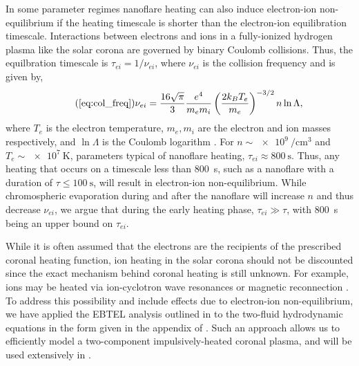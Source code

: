 In some parameter regimes nanoflare heating can also induce electron-ion non-equilibrium if the heating timescale is shorter than the electron-ion equilibration timescale. Interactions between electrons and ions in a fully-ionized hydrogen plasma like the solar corona are governed by binary Coulomb collisions. Thus, the equilbration timescale is $\tau_{ei}=1/\nu_{ei}$, where $\nu_{ei}$ is the collision frequency and is given by,
\begin{equation}\tag{\ref{eq:col_freq}}
    \nu_{ei} = \frac{16\sqrt{\pi}}{3}\frac{e^4}{m_em_i}\left(\frac{2k_BT_e}{m_e}\right)^{-3/2}n\ln{\Lambda},
\end{equation}
where $T_e$ is the electron temperature, $m_e,m_i$ are the electron and ion masses respectively, and $\ln{\Lambda}$ is the Coulomb logarithm \citep[see both Eq. 2.5e and Section 3 of][]{braginskii_transport_1965}. For $n\sim\SI{e9}{\per\cubic\cm}$ and $T_e\sim\SI{e7}{\kelvin}$, parameters typical of nanoflare heating, $\tau_{ei}\approx\SI{800}{\second}$. Thus, any heating that occurs on a timescale less than \SI{800}{\second}, such as a nanoflare with a duration of $\tau\le\SI{100}{\second}$, will result in electron-ion non-equilibrium. While chromospheric evaporation during and after the nanoflare will increase $n$ and thus decrease $\nu_{ei}$, we argue that during the early heating phase, $\tau_{ei}\gg\tau$, with \SI{800}{\second} being an upper bound on $\tau_{ei}$.

While it is often assumed that the electrons are the recipients of the prescribed coronal heating function, ion heating in the solar corona should not be discounted since the exact mechanism behind coronal heating is still unknown. For example, ions may be heated via ion-cyclotron wave resonances \citep[e.g.][]{markovskii_intermittent_2004} or magnetic reconnection \citep[e.g.][]{ono_ion_1996,drake_onset_2014}. To address this possibility and include effects due to electron-ion non-equilibrium, we have applied the EBTEL analysis outlined in \citet{klimchuk_highly_2008} to the two-fluid hydrodynamic equations in the form given in the appendix of \citet{bradshaw_influence_2013}. Such an approach allows us to efficiently model a two-component impulsively-heated coronal plasma, and will be used extensively in .

